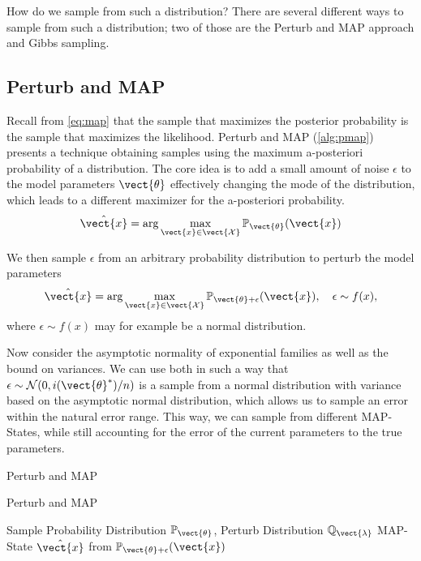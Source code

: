 How do we sample from such a distribution? There are several different ways to sample from such a distribution; two of those are the Perturb and MAP approach and Gibbs sampling.


\subsection{Perturb and MAP}
\label{ssec:pmap}
Recall from \autoref{eq:map} that the sample that maximizes the posterior probability is the sample that maximizes the likelihood.
Perturb and MAP (\autoref{alg:pmap}) presents a technique obtaining samples using the maximum a-posteriori probability of a distribution.
The core idea is to add a small amount of noise $\epsilon$ to the model parameters $\vect{\theta}$ effectively changing the mode of the distribution, which leads to a different maximizer for the a-posteriori probability. 
\begin{equation}
    \hat{\vect{x}}  = \arg\max_{\vect{x} \in \vect{\mathcal{X}}} \mathbb{P}_{\vect{\theta}}(\vect{x})
\end{equation}

We then sample $\epsilon$ from an arbitrary probability distribution to perturb the model parameters
\begin{equation}
    \hat{\vect{x}}  = \arg\max_{\vect{x} \in \vect{\mathcal{X}}} \mathbb{P}_{\vect{\theta} + \epsilon}(\vect{x}), \quad \epsilon \sim f(x),
\end{equation}
where $\epsilon \sim f(x)$ may for example be a normal distribution.

Now consider the asymptotic normality of exponential families as well as the bound on variances. 
We can use both in such a way that $\epsilon\sim \mathcal{N}(0, i(\vect{\theta}^*)/n)$ is a sample from a normal distribution with variance based on the asymptotic normal distribution, which allows us to sample an error within the natural error range.
This way, we can sample from different MAP-States, while still accounting for the error of the current parameters \wrt to the true parameters.


\begin{algo}{Perturb and MAP~\cite{papandreou2011perturb}}
    \begin{algorithm}[H]
        \caption{Perturb and MAP}
        \begin{algorithmic}[1]
            \label{alg:pmap}
            \REQUIRE Sample Probability Distribution $\mathbb{P}_{\vect{\theta}}$, Perturb Distribution $\mathbb{Q}_{\vect{\lambda}}$
            \ENSURE  MAP-State $\hat{\vect{x}}$ from $\mathbb{P}_{\vect{\theta} + \epsilon}(\vect{x})$ \\
            \\
            \\
        \end{algorithmic}
    \end{algorithm}
\end{algo}

